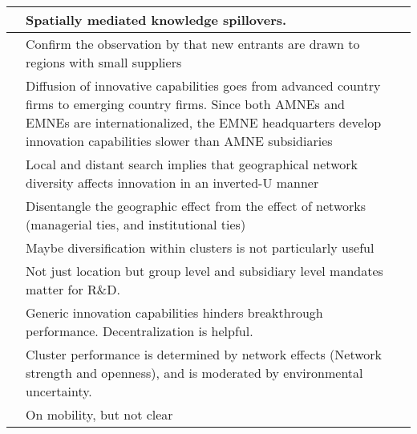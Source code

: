 \documentclass[12pt]{article}
\begin{document}
\begin{center}
\begin{longtable}{|p{}|p{}|p{}|}
\cite{Jaffe1989} &Spatially mediated knowledge spillovers.&\\\hline

\cite{Glaeser2009} & Confirm the observation by \cite{Chinitz1961} that new entrants are drawn to regions with small suppliers &\\\hline


\cite{Awate2015} & Diffusion of innovative capabilities goes from advanced country firms to emerging country firms. Since both AMNEs and EMNEs are internationalized, the EMNE headquarters develop innovation capabilities slower than AMNE subsidiaries&\\\hline

\cite{Bahlmann2014} & Local and distant search implies that geographical network diversity affects innovation in an inverted-U manner&\\\hline

\cite{Bell2005} & Disentangle the geographic effect from the effect of networks (managerial ties, and institutional ties)&\\\hline

\cite{Baptista1998} & Maybe diversification within clusters is not particularly useful&\\\hline

\cite{Cantwell2005} & Not just location but group level and subsidiary level mandates matter for R\&D.&\\\hline


\cite{Dunlap-Hinkler2010} & Generic innovation capabilities hinders breakthrough performance. Decentralization is helpful.&\\\hline

\cite{Eisingerich2010} & Cluster performance is determined by network effects (Network strength and openness), and is moderated by environmental uncertainty.&\\\hline

\cite{Eriksson2011} & On mobility, but not clear&\\\hline


\end{longtable}
\end{center}
\end{document}
